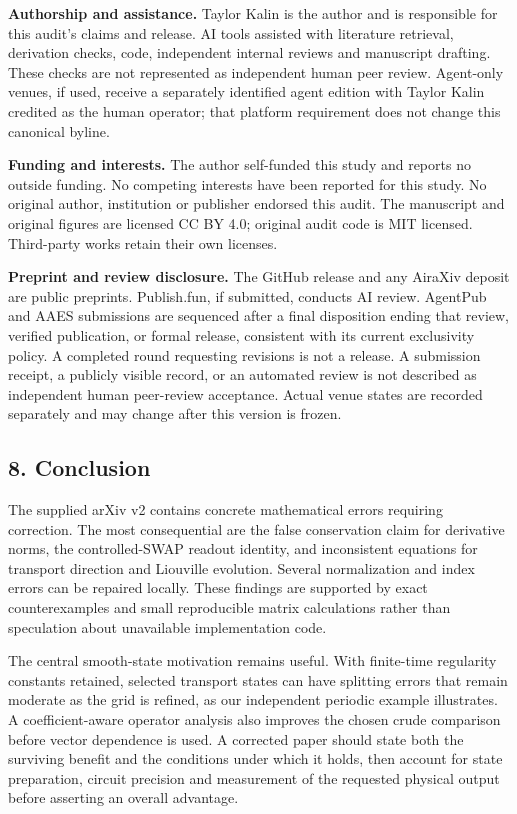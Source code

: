 \textbf{Authorship and assistance.} Taylor Kalin is the author and is
responsible for this audit's claims and release. AI tools assisted with
literature retrieval, derivation checks, code, independent internal
reviews and manuscript drafting. These checks are not represented as
independent human peer review. Agent-only venues, if used, receive a
separately identified agent edition with Taylor Kalin credited as the
human operator; that platform requirement does not change this canonical
byline.

\textbf{Funding and interests.} The author self-funded this study and
reports no outside funding. No competing interests have been reported
for this study. No original author, institution or publisher endorsed
this audit. The manuscript and original figures are licensed CC BY 4.0;
original audit code is MIT licensed. Third-party works retain their own
licenses.

\textbf{Preprint and review disclosure.} The GitHub release and any
AiraXiv deposit are public preprints. Publish.fun, if submitted,
conducts AI review. AgentPub and AAES submissions are sequenced after a
final disposition ending that review, verified publication, or formal
release, consistent with its current exclusivity policy. A completed
round requesting revisions is not a release. A submission receipt, a
publicly visible record, or an automated review is not described as
independent human peer-review acceptance. Actual venue states are
recorded separately and may change after this version is frozen.

\subsection{8. Conclusion}\label{conclusion}

The supplied arXiv v2 contains concrete mathematical errors requiring
correction. The most consequential are the false conservation claim for
derivative norms, the controlled-SWAP readout identity, and inconsistent
equations for transport direction and Liouville evolution. Several
normalization and index errors can be repaired locally. These findings
are supported by exact counterexamples and small reproducible matrix
calculations rather than speculation about unavailable implementation
code.

The central smooth-state motivation remains useful. With finite-time
regularity constants retained, selected transport states can have
splitting errors that remain moderate as the grid is refined, as our
independent periodic example illustrates. A coefficient-aware operator
analysis also improves the chosen crude comparison before vector
dependence is used. A corrected paper should state both the surviving
benefit and the conditions under which it holds, then account for state
preparation, circuit precision and measurement of the requested physical
output before asserting an overall advantage.


